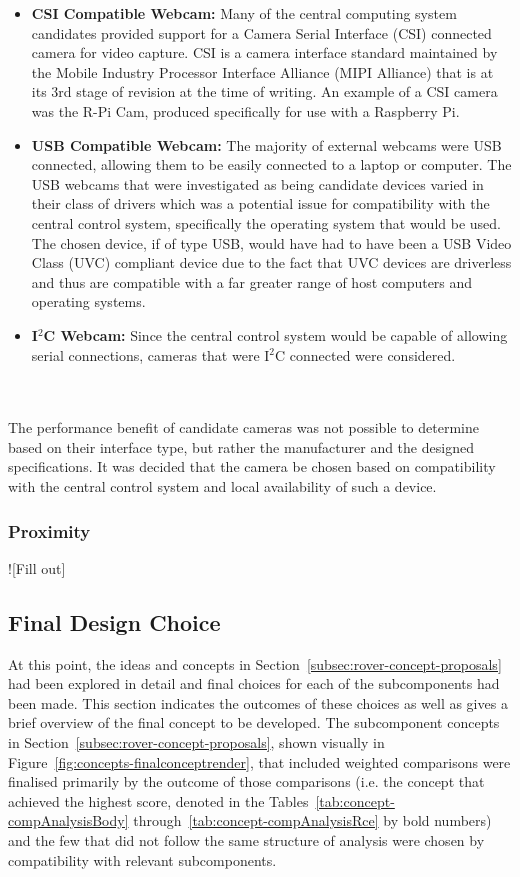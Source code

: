       \begin{itemize}
        \item \textbf{CSI Compatible Webcam:} Many of the central computing system candidates provided support for a Camera Serial Interface (CSI) connected camera for video capture. CSI is a camera interface standard maintained by the Mobile Industry Processor Interface Alliance (MIPI Alliance) that is at its 3rd stage of revision at the time of writing. An example of a CSI camera was the R-Pi Cam, produced specifically for use with a Raspberry Pi.
        \item \textbf{USB Compatible Webcam:} The majority of external webcams were USB connected, allowing them to be easily connected to a laptop or computer. The USB webcams that were investigated as being candidate devices varied in their class of drivers which was a potential issue for compatibility with the central control system, specifically the operating system that would be used. The chosen device, if of type USB, would have had to have been a USB Video Class (UVC) compliant device due to the fact that UVC devices are driverless and thus are compatible with a far greater range of host computers and operating systems.
        \item \textbf{I$^2$C Webcam:} Since the central control system would be capable of allowing serial connections, cameras that were I$^2$C connected were considered.
      \end{itemize}
      
      \\\\
        The performance benefit of candidate cameras was not possible to determine based on their interface type, but rather the manufacturer and the designed specifications. It was decided that the camera be chosen based on compatibility with the central control system and local availability of such a device.
      
    \subsubsection{Proximity}
      ![Fill out]
  
  \subsection{Final Design Choice}
    At this point, the ideas and concepts in Section~\ref{subsec:rover-concept-proposals} had been explored in detail and final choices for each of the subcomponents had been made. This section indicates the outcomes of these choices as well as gives a brief overview of the final concept to be developed. The subcomponent concepts in Section~\ref{subsec:rover-concept-proposals}, shown visually in Figure~\ref{fig:concepts-finalconceptrender}, that included weighted comparisons were finalised primarily by the outcome of those comparisons (i.e. the concept that achieved the highest score, denoted in the Tables~\ref{tab:concept-compAnalysisBody} through~\ref{tab:concept-compAnalysisRce} by bold numbers) and the few that did not follow the same structure of analysis were chosen by compatibility with relevant subcomponents.
    
